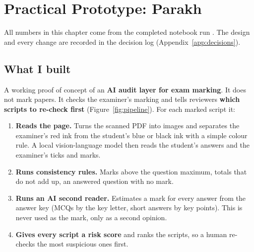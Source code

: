 \chapter{Practical Prototype: Parakh}
\label{sec:prototype}
All numbers in this chapter come from the completed notebook run \citep{notebook}. The design and every change are
recorded in the decision log (Appendix~\ref{app:decisions}).

\section{What I built}
A working proof of concept of an \textbf{AI audit layer for exam marking}. It does not mark papers. It checks the examiner's
marking and tells reviewers \textbf{which scripts to re-check first} (Figure~\ref{fig:pipeline}). For each marked script it:
\begin{enumerate}
  \item \textbf{Reads the page.} Turns the scanned PDF into images and separates the examiner's red ink from the student's
        blue or black ink with a simple colour rule. A local vision-language model then reads the student's answers and
        the examiner's ticks and marks.
  \item \textbf{Runs consistency rules.} Marks above the question maximum, totals that do not add up, an answered question
        with no mark.
  \item \textbf{Runs an AI second reader.} Estimates a mark for every answer from the answer key (MCQs by the key letter,
        short answers by key points). This is never used as the mark, only as a second opinion.
  \item \textbf{Gives every script a risk score} and ranks the scripts, so a human re-checks the most suspicious ones first.
\end{enumerate}


